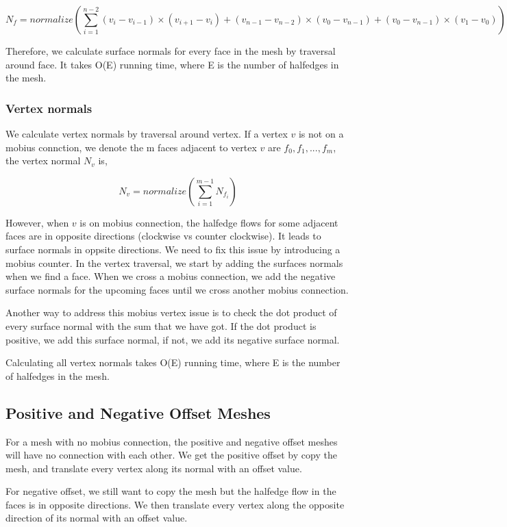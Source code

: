 \documentclass[12pt]{article}
\begin{document}
$$N_{f} = normalize(\sum\limits_{i=1}^{n-2} (v_i - v_{i - 1}) \times (v_{i + 1} - v_{i}) + (v_{n - 1} - v_{n - 2}) \times (v_0 - v_{n - 1}) + (v_0 - v_{n - 1}) \times (v_1 - v_0))$$

Therefore, we calculate surface normals for every face in the mesh by traversal around face. It takes O(E) running time, where E is the number of halfedges in the mesh.

\subsubsection{Vertex normals}
We calculate vertex normals by traversal around vertex. If a vertex $v$ is not on a mobius connction, we denote the m faces adjacent to vertex $v$ are $f_0, f_1, ..., f_m$, the vertex normal $N_v$ is,

$$N_{v} = normalize(\sum\limits_{i=1}^{m-1} N_{f_i})$$

However, when $v$ is on mobius connection, the halfedge flows for some adjacent faces are in opposite directions (clockwise vs counter clockwise). It leads to surface normals in oppsite directions. We need to fix this issue by introducing a mobius counter. In the vertex traversal, we start by adding the surfaces normals when we find a face. When we cross a mobius connection, we add the negative surface normals for the upcoming faces until we cross another mobius connection.

Another way to address this mobius vertex issue is to check the dot product of every surface normal with the sum that we have got. If the dot product is positive, we add this surface normal, if not, we add its negative surface normal.

Calculating all vertex normals takes O(E) running time, where E is the number of halfedges in the mesh.

\subsection{Positive and Negative Offset Meshes}

For a mesh with no mobius connection, the positive and negative offset meshes will have no connection with each other. We get the positive offset by copy the mesh, and translate every vertex along its normal with an offset value. 

For negative offset, we still want to copy the mesh but the halfedge flow in the faces is in opposite directions. We then translate every vertex along the opposite direction of its normal with an offset value.
\end{document}
